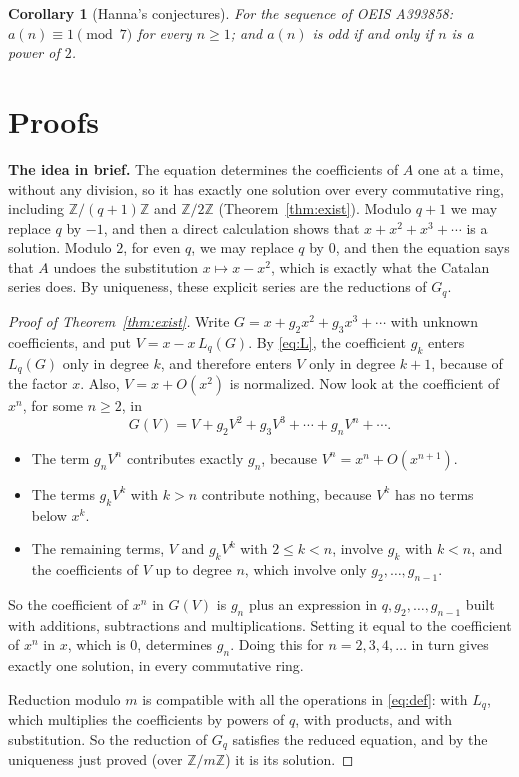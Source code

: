 \documentclass[11pt,a4paper]{article}
\newtheorem{corollary}[theorem]{Corollary}
\theoremstyle{definition}
\theoremstyle{remark}
\newcommand{\Z}{\mathbb{Z}}
\newcommand{\para}[1]{\par\medskip\noindent\textbf{#1}\enspace}
\begin{document}
\begin{corollary}[Hanna's conjectures]\label{cor:oeis}
For the sequence of OEIS A393858: $a(n)\equiv1\pmod{7}$ for every $n\ge1$; and $a(n)$ is odd if and only if $n$ is a power of $2$.
\end{corollary}

\section{Proofs}\label{sec:proofs}

\para{The idea in brief.} The equation determines the coefficients of $A$ one at a time, without any division, so it
has exactly one solution over every commutative ring, including $\Z/(q+1)\Z$ and $\Z/2\Z$
(Theorem~\ref{thm:exist}). Modulo $q+1$ we may replace $q$ by $-1$, and then a direct calculation shows that $x+x^2+x^3+\cdots$ is
a solution. Modulo $2$, for even $q$, we may replace $q$ by $0$, and then the equation says that $A$ undoes the
substitution $x\mapsto x-x^2$, which is exactly what the Catalan series does. By uniqueness, these explicit series
are the reductions of $G_q$.

\begin{proof}[Proof of Theorem~\ref{thm:exist}]
Write $G=x+g_2x^2+g_3x^3+\cdots$ with unknown coefficients, and put $V=x-x\,L_q(G)$. By \eqref{eq:L}, the coefficient
$g_k$ enters $L_q(G)$ only in degree $k$, and therefore enters $V$ only in degree $k+1$, because of the factor $x$. Also,
$V=x+O(x^2)$ is normalized. Now look at the coefficient of $x^n$, for some $n\ge2$, in
\[
G(V)=V+g_2V^2+g_3V^3+\cdots+g_nV^n+\cdots .
\]
\begin{itemize}
\item The term $g_nV^n$ contributes exactly $g_n$, because $V^n=x^n+O(x^{n+1})$.
\item The terms $g_kV^k$ with $k>n$ contribute nothing, because $V^k$ has no terms below $x^k$.
\item The remaining terms, $V$ and $g_kV^k$ with $2\le k<n$, involve $g_k$ with $k<n$, and the coefficients of $V$ up
to degree $n$, which involve only $g_2,\dots,g_{n-1}$.
\end{itemize}
So the coefficient of $x^n$ in $G(V)$ is $g_n$ plus an expression in $q,g_2,\dots,g_{n-1}$ built with additions,
subtractions and multiplications. Setting it equal to the coefficient of $x^n$ in $x$, which is $0$, determines $g_n$.
Doing this for $n=2,3,4,\dots$ in turn gives exactly one solution, in every commutative ring.

Reduction modulo $m$ is compatible with all the operations in \eqref{eq:def}: with $L_q$, which multiplies the
coefficients by powers of $q$, with products, and with substitution. So the reduction of $G_q$ satisfies the reduced
equation, and by the uniqueness just proved (over $\Z/m\Z$) it is its solution.
\end{proof}
\end{document}
